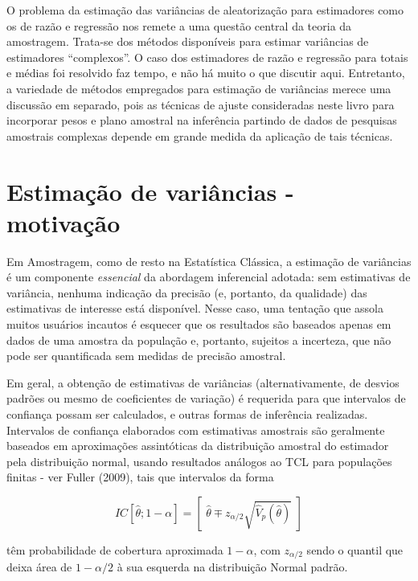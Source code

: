 \documentclass[
  12pt,
  brazilian,
]{book}
\theoremstyle{definition}
\theoremstyle{definition}
\theoremstyle{definition}
\theoremstyle{definition}
\theoremstyle{remark}
\begin{document}
O problema da estimação das variâncias de aleatorização para estimadores como os de razão e regressão nos remete a uma questão central da teoria da amostragem. Trata-se dos métodos disponíveis para estimar variâncias de estimadores ``complexos''. O caso dos estimadores de razão e regressão para totais e médias foi resolvido faz tempo, e não há muito o que discutir aqui. Entretanto, a variedade de métodos empregados para estimação de variâncias merece uma discussão em separado, pois as técnicas de ajuste consideradas neste livro para incorporar pesos e plano amostral na inferência partindo de dados de pesquisas amostrais complexas depende em grande medida da aplicação de tais técnicas.

\hypertarget{estimauxe7uxe3o-de-variuxe2ncias---motivauxe7uxe3o}{%
\section{Estimação de variâncias - motivação}\label{estimauxe7uxe3o-de-variuxe2ncias---motivauxe7uxe3o}}

Em Amostragem, como de resto na Estatística Clássica, a estimação de variâncias é um componente \emph{essencial} da abordagem inferencial adotada: sem estimativas de variância, nenhuma indicação da precisão (e, portanto, da qualidade) das estimativas
de interesse está disponível. Nesse caso, uma tentação que assola muitos usuários incautos é esquecer que os resultados são baseados apenas em dados de uma amostra da população e, portanto, sujeitos a incerteza, que não pode ser quantificada sem medidas de precisão amostral.

Em geral, a obtenção de estimativas de variâncias (alternativamente, de desvios padrões ou mesmo de coeficientes de variação) é requerida para que intervalos de confiança possam ser calculados, e outras formas de inferência realizadas. Intervalos de confiança elaborados com estimativas amostrais são geralmente
baseados em aproximações assintóticas da distribuição amostral do estimador pela distribuição normal, usando resultados análogos ao TCL para populações finitas - ver Fuller (2009), tais que intervalos da forma

\[
IC\left[ \widehat{\theta } ; 1-\alpha \right] =\left[ \,\, \widehat{\theta } \mp z_{\alpha /2}\sqrt{\widehat{V}_{p} \left( \widehat{\theta} \right) } \,\, \right] 
\]

têm probabilidade de cobertura aproximada \(1-\alpha\), com \(z_{\alpha /2}\) sendo o quantil que deixa área de \(1-\alpha/2\) à sua esquerda na distribuição Normal padrão.
\end{document}
